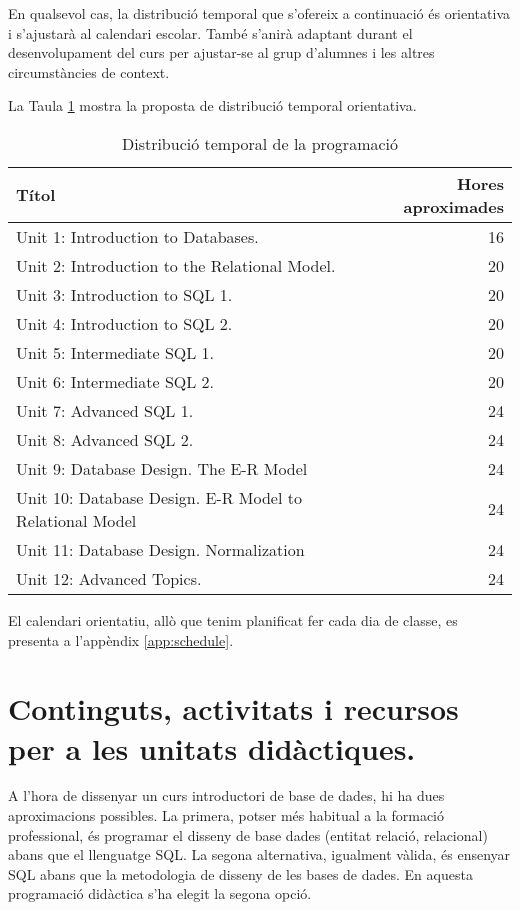 \documentclass[catalan, a4paper, 12pt, titlepage]{article}
\begin{document}
En qualsevol cas, la distribució temporal que s'ofereix a continuació és orientativa i s'ajustarà al calendari escolar. També s'anirà adaptant durant el desenvolupament del curs per ajustar-se al grup d'alumnes i les altres circumstàncies de context.

La Taula \ref{tab:distribuciotemporal} mostra la proposta de distribució temporal orientativa.

\begin{table}
	\centering
\begin{tabular}{lr}
 Títol & Hores aproximades\\
 \hline
 Unit 1: Introduction to Databases. & 16\\
 Unit 2: Introduction to the Relational Model. & 20  \\
 Unit 3: Introduction to SQL 1. & 20\\
 Unit 4: Introduction to SQL 2. & 20 \\
 Unit 5: Intermediate SQL 1. & 20 \\
 Unit 6: Intermediate SQL 2. & 20 \\
 Unit 7: Advanced SQL 1. & 24 \\
 Unit 8: Advanced SQL 2. & 24\\
 Unit 9: Database Design. The E-R Model & 24\\
 Unit 10: Database Design. E-R Model to Relational Model & 24 \\
 Unit 11: Database Design. Normalization & 24 \\
 Unit 12: Advanced Topics. & 24 \\
\end{tabular}
	\caption{Distribució temporal de la programació} \label{tab:distribuciotemporal}
\end{table}

El calendari orientatiu, allò que tenim planificat fer cada dia de classe, es presenta a l'appèndix \ref{app:schedule}.

\section{Continguts, activitats i recursos per a les unitats didàctiques.}
\label{sec:unitats}

A l'hora de dissenyar un curs introductori de base de dades, hi ha dues aproximacions possibles.
La primera, potser més habitual a la formació professional, és programar el disseny de base dades (entitat relació, relacional) abans que el llenguatge SQL.
La segona alternativa, igualment vàlida, és ensenyar SQL abans que la metodologia de disseny de les bases de dades.
En aquesta programació didàctica s'ha elegit la segona opció.
\end{document}
